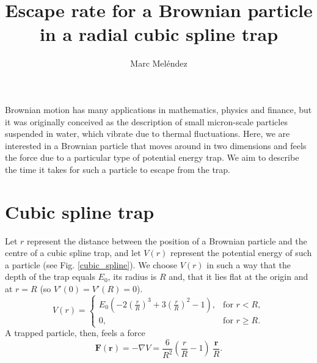 \documentclass{article}
\title{Escape rate for a Brownian particle in a radial cubic spline trap}
\author{Marc Meléndez}
\begin{document}
\maketitle

Brownian motion has many applications in mathematics, physics and finance, but
it was originally conceived as the description of small micron-scale particles
suspended in water, which vibrate due to thermal fluctuations. Here, we are
interested in a Brownian particle that moves around in two dimensions and feels
the force due to a particular type of potential energy trap. We aim to describe
the time it takes for such a particle to escape from the trap.

\section{Cubic spline trap}

Let $r$ represent the distance between the position of a Brownian particle and
the centre of a cubic spline trap, and let $V(r)$ represent the potential energy
of such a particle (see Fig. \ref{cubic_spline}). We choose $V(r)$ in such a way
that the depth of the trap equals $E_0$, its radius is $R$ and, that it lies
flat at the origin and at $r = R$ (so $V'(0) = V'(R) = 0$).
\begin{equation}
  V(r) =
  \begin{cases}
    E_0 \left(-2\left(\frac{r}{R}\right)^3
              + 3 \left(\frac{r}{R}\right)^2 - 1\right), & \text{for } r < R, \\
    0, & \text{for } r \geq R.
  \end{cases}
\end{equation}
A trapped particle, then, feels a force
\begin{equation}
  \mathbf{F}(\mathbf{r}) = -\nabla V
                         = \frac{6}{R^2}
                           \left(\frac{r}{R} - 1\right)\ \frac{\mathbf{r}}{R}.
\end{equation}

\end{document}
